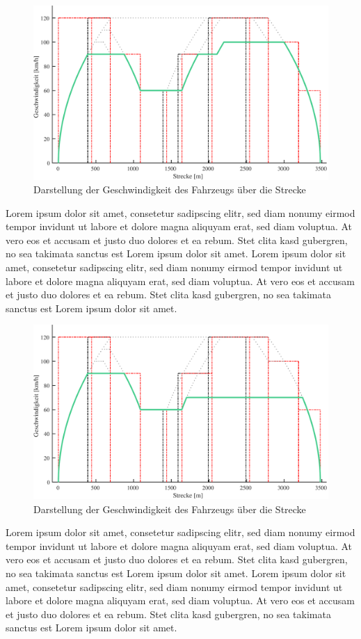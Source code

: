 \begin{figure}[H]
  \includegraphics[width=\linewidth]{../matlab/it_5.pdf}
  \caption{Darstellung der Geschwindigkeit des Fahrzeugs über die Strecke}
\end{figure}
Lorem ipsum dolor sit amet, consetetur sadipscing elitr, sed diam nonumy eirmod tempor invidunt ut labore et dolore magna aliquyam erat, sed diam voluptua. At vero eos et accusam et justo duo dolores et ea rebum. Stet clita kasd gubergren, no sea takimata sanctus est Lorem ipsum dolor sit amet. Lorem ipsum dolor sit amet, consetetur sadipscing elitr, sed diam nonumy eirmod tempor invidunt ut labore et dolore magna aliquyam erat, sed diam voluptua. At vero eos et accusam et justo duo dolores et ea rebum. Stet clita kasd gubergren, no sea takimata sanctus est Lorem ipsum dolor sit amet.
\begin{figure}[H]
  \includegraphics[width=\linewidth]{../matlab/it_6.pdf}
  \caption{Darstellung der Geschwindigkeit des Fahrzeugs über die Strecke}
\end{figure}
Lorem ipsum dolor sit amet, consetetur sadipscing elitr, sed diam nonumy eirmod tempor invidunt ut labore et dolore magna aliquyam erat, sed diam voluptua. At vero eos et accusam et justo duo dolores et ea rebum. Stet clita kasd gubergren, no sea takimata sanctus est Lorem ipsum dolor sit amet. Lorem ipsum dolor sit amet, consetetur sadipscing elitr, sed diam nonumy eirmod tempor invidunt ut labore et dolore magna aliquyam erat, sed diam voluptua. At vero eos et accusam et justo duo dolores et ea rebum. Stet clita kasd gubergren, no sea takimata sanctus est Lorem ipsum dolor sit amet.
